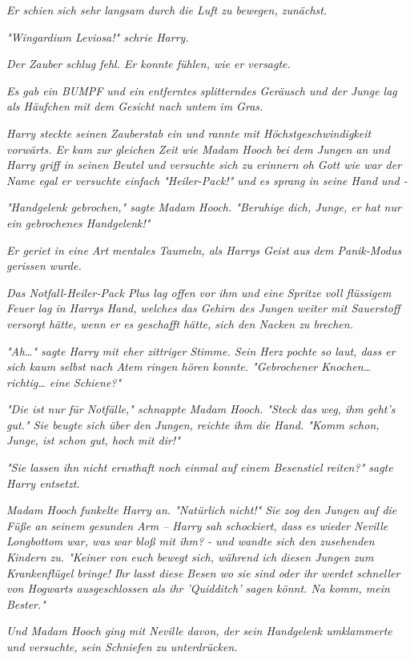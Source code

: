 {\emph{Er schien sich sehr langsam durch die Luft zu bewegen, zunächst.}

\emph{"\emph{Wingardium Leviosa!}" schrie Harry.}

\emph{Der Zauber schlug fehl. Er konnte fühlen, wie er versagte.}

\emph{Es gab ein BUMPF und ein entferntes splitterndes Geräusch und der Junge lag als Häufchen mit dem Gesicht nach untem im Gras.}

\emph{Harry steckte seinen Zauberstab ein und rannte mit Höchstgeschwindigkeit vorwärts. Er kam zur gleichen Zeit wie Madam Hooch bei dem Jungen an und Harry griff in seinen Beutel und versuchte sich zu erinnern oh Gott wie war der Name egal er versuchte einfach "Heiler-Pack!" und es sprang in seine Hand und -}

\emph{"Handgelenk gebrochen," sagte Madam Hooch. "Beruhige dich, Junge, er hat nur ein gebrochenes Handgelenk!"}

\emph{Er geriet in eine Art mentales Taumeln, als Harrys Geist aus dem Panik-Modus gerissen wurde.}

\emph{Das Notfall-Heiler-Pack Plus lag offen vor ihm und eine Spritze voll flüssigem Feuer lag in Harrys Hand, welches das Gehirn des Jungen weiter mit Sauerstoff versorgt hätte, wenn er es geschafft hätte, sich den Nacken zu brechen.}

\emph{"Ah…" sagte Harry mit eher zittriger Stimme. Sein Herz pochte so laut, dass er sich kaum selbst nach Atem ringen hören konnte. "Gebrochener Knochen… richtig… eine Schiene?"}

\emph{"Die ist nur für Notfälle," schnappte Madam Hooch. "Steck das weg, ihm geht's gut." Sie beugte sich über den Jungen, reichte ihm die Hand. "Komm schon, Junge, ist schon gut, hoch mit dir!"}

\emph{"Sie lassen ihn nicht ernsthaft noch einmal auf einem Besenstiel reiten?" sagte Harry entsetzt.}

\emph{Madam Hooch funkelte Harry an. "Natürlich nicht!" Sie zog den Jungen auf die Füße an seinem gesunden Arm -- Harry sah schockiert, dass es} \emph{\emph{wieder}} \emph{Neville Longbottom war, was} \emph{\emph{war}} \emph{bloß mit ihm? - und wandte sich den zusehenden Kindern zu. "Keiner von euch bewegt sich, während ich diesen Jungen zum Krankenflügel bringe! Ihr lasst diese Besen wo sie sind oder ihr werdet schneller von Hogwarts ausgeschlossen als ihr 'Quidditch' sagen könnt. Na komm, mein Bester."}

\emph{Und Madam Hooch ging mit Neville davon, der sein Handgelenk umklammerte und versuchte, sein Schniefen zu unterdrücken.}

}
